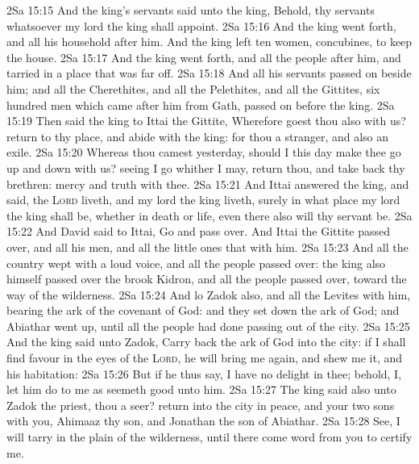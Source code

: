 \vs 2Sa 15:15 And the king's servants said unto the king, Behold, thy servants  whatsoever my lord the king shall appoint.
\vs 2Sa 15:16 And the king went forth, and all his household after him. And the king left ten women,  concubines, to keep the house.
\vs 2Sa 15:17 And the king went forth, and all the people after him, and tarried in a place that was far off.
\vs 2Sa 15:18 And all his servants passed on beside him; and all the Cherethites, and all the Pelethites, and all the Gittites, six hundred men which came after him from Gath, passed on before the king.
\vs 2Sa 15:19 Then said the king to Ittai the Gittite, Wherefore goest thou also with us? return to thy place, and abide with the king: for thou  a stranger, and also an exile.
\vs 2Sa 15:20 Whereas thou camest  yesterday, should I this day make thee go up and down with us? seeing I go whither I may, return thou, and take back thy brethren: mercy and truth  with thee.
\vs 2Sa 15:21 And Ittai answered the king, and said,  the \textsc{Lord} liveth, and  my lord the king liveth, surely in what place my lord the king shall be, whether in death or life, even there also will thy servant be.
\vs 2Sa 15:22 And David said to Ittai, Go and pass over. And Ittai the Gittite passed over, and all his men, and all the little ones that  with him.
\vs 2Sa 15:23 And all the country wept with a loud voice, and all the people passed over: the king also himself passed over the brook Kidron, and all the people passed over, toward the way of the wilderness.
\vs 2Sa 15:24 And lo Zadok also, and all the Levites  with him, bearing the ark of the covenant of God: and they set down the ark of God; and Abiathar went up, until all the people had done passing out of the city.
\vs 2Sa 15:25 And the king said unto Zadok, Carry back the ark of God into the city: if I shall find favour in the eyes of the \textsc{Lord}, he will bring me again, and shew me  it, and his habitation:
\vs 2Sa 15:26 But if he thus say, I have no delight in thee; behold,  I, let him do to me as seemeth good unto him.
\vs 2Sa 15:27 The king said also unto Zadok the priest,  thou a seer? return into the city in peace, and your two sons with you, Ahimaaz thy son, and Jonathan the son of Abiathar.
\vs 2Sa 15:28 See, I will tarry in the plain of the wilderness, until there come word from you to certify me.
